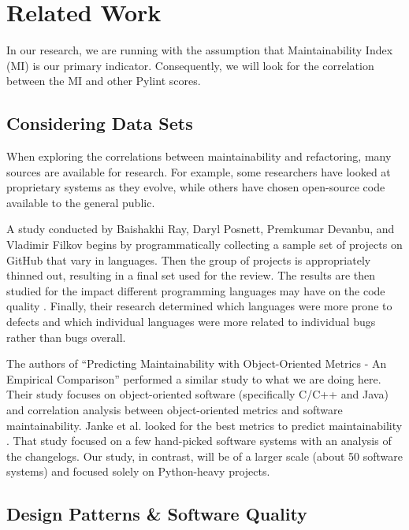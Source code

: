 
\section{Related Work} \label{sectionRelatedWork}

In our research, we are running with the assumption that Maintainability Index (MI) is our primary indicator. Consequently, we will look for the correlation between the MI and other Pylint scores.

\subsection{Considering Data Sets}

When exploring the correlations between maintainability and refactoring, many sources are available for research. For example, some researchers have looked at proprietary systems as they evolve, while others have chosen open-source code available to the general public.

A study conducted by Baishakhi Ray, Daryl Posnett, Premkumar Devanbu, and Vladimir Filkov begins by programmatically collecting a sample set of projects on GitHub that vary in languages. Then the group of projects is appropriately thinned out, resulting in a final set used for the review. The results are then studied for the impact different programming languages may have on the code quality \cite{baishakhi:2017}. Finally, their research determined which languages were more prone to defects and which individual languages were more related to individual bugs rather than bugs overall.

The authors of ``Predicting Maintainability with Object-Oriented Metrics - An Empirical Comparison'' performed a similar study to what we are doing here. Their study focuses on object-oriented software (specifically C/C++ and Java) and correlation analysis between object-oriented metrics and software maintainability. Janke et al. looked for the best metrics to predict maintainability \cite{janke:2003}. That study focused on a few hand-picked software systems with an analysis of the changelogs. Our study, in contrast, will be of a larger scale (about 50 software systems) and focused solely on Python-heavy projects.

\subsection{Design Patterns \& Software Quality}

